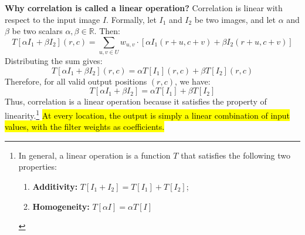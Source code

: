 \highspace
\textcolor{Green3}{ \textbf{Why correlation is called a linear operation?}} Correlation is linear with respect to the input image $I$. Formally, let $I_1$ and $I_2$ be two images, and let $\alpha$ and $\beta$ be two scalars $\alpha, \beta \in \mathbb{R}$. Then:
\begin{equation*}
    T\left[\alpha I_1 + \beta I_2\right]\left(r,c\right) = \sum_{u,v \in U} w_{u,v} \cdot \left[\alpha I_1\left(r+u, c+v\right) + \beta I_2\left(r+u, c+v\right)\right]
\end{equation*}
Distributing the sum gives:
\begin{equation*}
    T\left[\alpha I_1 + \beta I_2\right]\left(r,c\right) = \alpha T\left[I_1\right]\left(r,c\right) + \beta T\left[I_2\right]\left(r,c\right)
\end{equation*}
Therefore, for all valid output positions $(r,c)$, we have:
\begin{equation}
    T\left[\alpha I_1 + \beta I_2\right] = \alpha T\left[I_1\right] + \beta T\left[I_2\right]
\end{equation}
Thus, correlation is a linear operation because it satisfies the property of linearity.\footnote{
    In general, a linear operation is a function $T$ that satisfies the following two properties:
    \begin{enumerate}
        \item \textbf{Additivity:} $T\left[I_1 + I_2\right] = T\left[I_1\right] + T\left[I_2\right]$;
        \item \textbf{Homogeneity:} $T\left[\alpha I\right] = \alpha T\left[I\right]$
    \end{enumerate}
} \hl{At every location, the output is simply a linear combination of input values, with the filter weights as coefficients.}

